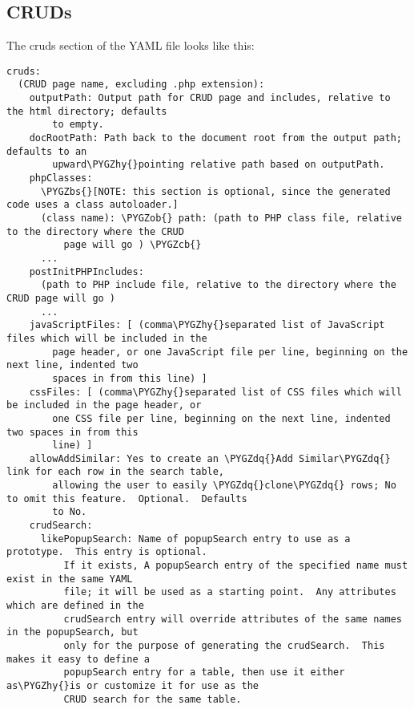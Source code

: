 \documentclass[letterpaper,10pt,english]{sphinxmanual}
\def\PYGZbs{\char`\\}
\def\PYGZob{\char`\{}
\def\PYGZcb{\char`\}}
\def\PYGZhy{\char`\-}
\def\PYGZdq{\char`\"}
\begin{document}
\subsection{CRUDs}
\label{jaxFrameworkGuide:cruds}
The cruds section of the YAML file looks like this:

\begin{Verbatim}[commandchars=\\\{\}]
cruds:
  (CRUD page name, excluding .php extension):
    outputPath: Output path for CRUD page and includes, relative to the html directory; defaults
        to empty.
    docRootPath: Path back to the document root from the output path; defaults to an
        upward\PYGZhy{}pointing relative path based on outputPath.
    phpClasses:
      \PYGZbs{}[NOTE: this section is optional, since the generated code uses a class autoloader.]
      (class name): \PYGZob{} path: (path to PHP class file, relative to the directory where the CRUD
          page will go ) \PYGZcb{}
      ...
    postInitPHPIncludes:
      (path to PHP include file, relative to the directory where the CRUD page will go )
      ...
    javaScriptFiles: [ (comma\PYGZhy{}separated list of JavaScript files which will be included in the
        page header, or one JavaScript file per line, beginning on the next line, indented two
        spaces in from this line) ]
    cssFiles: [ (comma\PYGZhy{}separated list of CSS files which will be included in the page header, or
        one CSS file per line, beginning on the next line, indented two spaces in from this
        line) ]
    allowAddSimilar: Yes to create an \PYGZdq{}Add Similar\PYGZdq{} link for each row in the search table,
        allowing the user to easily \PYGZdq{}clone\PYGZdq{} rows; No to omit this feature.  Optional.  Defaults
        to No.
    crudSearch:
      likePopupSearch: Name of popupSearch entry to use as a prototype.  This entry is optional.
          If it exists, A popupSearch entry of the specified name must exist in the same YAML
          file; it will be used as a starting point.  Any attributes which are defined in the
          crudSearch entry will override attributes of the same names in the popupSearch, but
          only for the purpose of generating the crudSearch.  This makes it easy to define a
          popupSearch entry for a table, then use it either as\PYGZhy{}is or customize it for use as the
          CRUD search for the same table.


\end{Verbatim}
\end{document}
